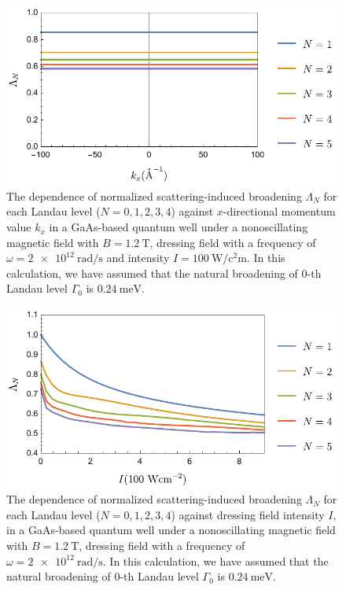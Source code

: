 \begin{figure}[h!]
\includegraphics[scale=0.68]{figures/fig_2}
\caption{\label{fig_3} The dependence of normalized scattering-induced broadening $\Lambda_N$ for each Landau level ($N =0,1,2,3,4$) against $x$-directional momentum value $k_x$ in a GaAs-based quantum well under a nonoscillating magnetic field with $B = \SI{1.2}{\tesla}$, dressing field with a  frequency of $\omega =\SI{2e12}{\radian\per\second}$ and intensity $I =\SI{100}{\watt\per\square\centi\metre}$.
In this calculation, we have assumed that the natural  broadening of $0$-th Landau level $\Gamma_0$ is $\SI{0.24}{\milli\eV}$.}
\end{figure}
\begin{figure}[t!]
\includegraphics[scale=0.68]{figures/fig_3}
\caption{\label{fig_4} The dependence of normalized scattering-induced broadening $\Lambda_N$ for each Landau level ($N =0,1,2,3,4$) against dressing field intensity $I$, in a GaAs-based quantum well under a nonoscillating magnetic field with $B = \SI{1.2}{\tesla}$, dressing field with a frequency of $\omega =\SI{2e12}{\radian\per\second}$. In this calculation, we have assumed that the natural broadening of $0$-th Landau level $\Gamma_0$ is $\SI{0.24}{\milli\eV}$.}
\end{figure}

